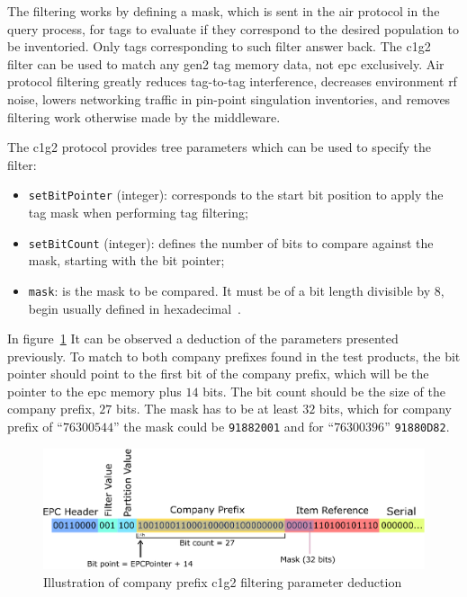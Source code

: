 The filtering works by defining a mask, which is sent in the air protocol in the query process, for tags to evaluate if they correspond to the desired population to be inventoried. Only tags corresponding to such filter answer back.
The \ac{c1g2} filter can be used to match any \ac{gen2} tag memory data, not \ac{epc} exclusively.
Air protocol filtering greatly reduces tag-to-tag interference, decreases environment \ac{rf} noise, lowers networking traffic in pin-point singulation inventories, and removes filtering work otherwise made by the middleware.

The \ac{c1g2} protocol provides tree parameters which can be used to specify the filter: 

\begin{itemize}
  \item \texttt{setBitPointer} (integer): corresponds to the start bit position to apply the tag mask when performing tag filtering;
  \item \texttt{setBitCount} (integer): defines the number of bits to compare against the mask, starting with the bit pointer;
  \item \texttt{mask}: is the mask to be compared. It must be of a bit length divisible by $8$, begin usually defined in hexadecimal~\cite{LowLevelReader}.
\end{itemize}

In figure~\ref{fig:c1g2filter} It can be observed a deduction of the parameters presented previously.
To match to both company prefixes found in the test products, the bit pointer should point to the first bit of the company prefix, which will be the pointer to the \ac{epc} memory plus $14$ bits.
The bit count should be the size of the company prefix, $27$ bits. The mask has to be at least $32$ bits, which for company prefix of ``$76300544$'' the mask could be \texttt{91882001} and for ``$76300396$'' \texttt{91880D82}.

\begin{figure}
  \centering
  \includegraphics[width=\textwidth]{figs/c1g2filter.eps}
  \caption{Illustration of company prefix \ac{c1g2} filtering parameter deduction}
  \label{fig:c1g2filter}
\end{figure}


